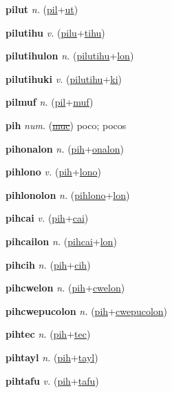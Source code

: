 \textbf{\hypertarget{pilut}{pilut}} \textit{n.} (\hyperlink{pil}{pil}+\allowbreak \hyperlink{ut}{ut})


\textbf{\hypertarget{pilutihu}{pilutihu}} \textit{v.} (\hyperlink{pilu}{pilu}+\allowbreak \hyperlink{tihu}{tihu})


\textbf{\hypertarget{pilutihulon}{pilutihulon}} \textit{n.} (\hyperlink{pilutihu}{pilutihu}+\allowbreak \hyperlink{lon}{lon})


\textbf{\hypertarget{pilutihuki}{pilutihuki}} \textit{v.} (\hyperlink{pilutihu}{pilutihu}+\allowbreak \hyperlink{ki}{ki})


\textbf{\hypertarget{pilmuf}{pilmuf}} \textit{n.} (\hyperlink{pil}{pil}+\allowbreak \hyperlink{muf}{muf})


\textbf{\hypertarget{pih}{pih}} \textit{num.} (\hyperlink{muc}{\sout{muc}})
poco; pocos

\textbf{\hypertarget{pihonalon}{pihonalon}} \textit{n.} (\hyperlink{pih}{pih}+\allowbreak \hyperlink{onalon}{onalon})


\textbf{\hypertarget{pihlono}{pihlono}} \textit{v.} (\hyperlink{pih}{pih}+\allowbreak \hyperlink{lono}{lono})


\textbf{\hypertarget{pihlonolon}{pihlonolon}} \textit{n.} (\hyperlink{pihlono}{pihlono}+\allowbreak \hyperlink{lon}{lon})


\textbf{\hypertarget{pihcai}{pihcai}} \textit{v.} (\hyperlink{pih}{pih}+\allowbreak \hyperlink{cai}{cai})


\textbf{\hypertarget{pihcailon}{pihcailon}} \textit{n.} (\hyperlink{pihcai}{pihcai}+\allowbreak \hyperlink{lon}{lon})


\textbf{\hypertarget{pihcih}{pihcih}} \textit{n.} (\hyperlink{pih}{pih}+\allowbreak \hyperlink{cih}{cih})


\textbf{\hypertarget{pihcwelon}{pihcwelon}} \textit{n.} (\hyperlink{pih}{pih}+\allowbreak \hyperlink{cwelon}{cwelon})


\textbf{\hypertarget{pihcwepucolon}{pihcwepucolon}} \textit{n.} (\hyperlink{pih}{pih}+\allowbreak \hyperlink{cwepucolon}{cwepucolon})


\textbf{\hypertarget{pihtec}{pihtec}} \textit{n.} (\hyperlink{pih}{pih}+\allowbreak \hyperlink{tec}{tec})


\textbf{\hypertarget{pihtayl}{pihtayl}} \textit{n.} (\hyperlink{pih}{pih}+\allowbreak \hyperlink{tayl}{tayl})


\textbf{\hypertarget{pihtafu}{pihtafu}} \textit{v.} (\hyperlink{pih}{pih}+\allowbreak \hyperlink{tafu}{tafu})


